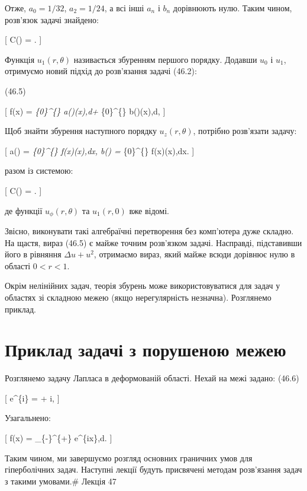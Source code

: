 \documentclass[
  ukrainian,
]{article}
\begin{document}
Отже, \(a_0=1/32\), \(a_2=1/24\), а всі інші \(a_n\) і \(b_n\)
дорівнюють нулю. Таким чином, розв'язок задачі знайдено:

{[} C(\xi) = . {]}

Функція \(u_1(r,\theta)\) називається збуренням першого порядку. Додавши
\(u_0\) і \(u_1\), отримуємо новий підхід до розв'язання задачі (46.2):

(46.5)

{[} f(x) = \int\emph{\{0\}\^{}\{\infty\} a(\xi)\cos(\xi x),d\xi +
\int}\{0\}\^{}\{\infty\} b(\xi)\sin(\xi x),d\xi, {]}

Щоб знайти збурення наступного порядку \(u_z(r,\theta)\), потрібно
розв'язати задачу:

{[} a(\xi) = \int\emph{\{0\}\^{}\{\infty\}
f(x)\cos(\xi x),dx, \qquad b(\xi) =
\int}\{0\}\^{}\{\infty\} f(x)\sin(\xi x),dx. {]}

разом із системою:

{[} C(\xi) = . {]}

де функції \(u_{\phi}(r,\theta)\) та \(u_{1}(r,0)\) вже відомі.

Звісно, виконувати такі алгебраїчні перетворення без комп'ютера дуже
складно. На щастя, вираз (46.5) є майже точним розв'язком задачі.
Насправді, підставивши його в рівняння \(\Delta u + u^{2}\), отримаємо
вираз, який майже всюди дорівнює нулю в області \(0 < r < 1\).

Окрім нелінійних задач, теорія збурень може використовуватися для задач
у областях зі складною межею (якщо нерегулярність незначна). Розглянемо
приклад.

\section{Приклад задачі з порушеною
межею}\label{ux43fux440ux438ux43aux43bux430ux434-ux437ux430ux434ux430ux447ux456-ux437-ux43fux43eux440ux443ux448ux435ux43dux43eux44e-ux43cux435ux436ux435ux44e}

Розглянемо задачу Лапласа в деформованій області. Нехай на межі задано:
(46.6)

{[} e\^{}\{i\theta\} = \cos\theta + i\sin\theta, {]}

Узагальнено:

{[} f(x) =  \int\_\{-\infty\}\^{}\{+\infty\}
e\^{}\{i\xi x\},d\xi.
{]}

Таким чином, ми завершуємо розгляд основних граничних умов для
гіперболічних задач. Наступні лекції будуть присвячені методам
розв'язання задач з такими умовами.\# Лекція 47
\end{document}
